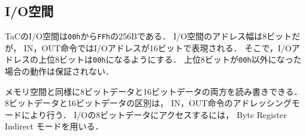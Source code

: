 \subsection{I/O空間}
TaCのI/O空間は{\tt 00h}から{\tt FFh}の256Bである．
I/O空間のアドレス幅は8ビットだが，
IN，OUT命令ではI/Oアドレスが16ビットで表現される．
そこで，I/Oアドレスの上位8ビットは{\tt 00h}になるようにする．
上位8ビットが{\tt 00h}以外になった場合の動作は保証されない．

メモリ空間と同様に8ビットデータと16ビットデータの両方を読み書きできる．
8ビットデータと16ビットデータの区別は，
IN，OUT命令のアドレッシングモードにより行う．
I/Oの8ビットデータにアクセスするには，
Byte Register Indirect モードを用いる．

